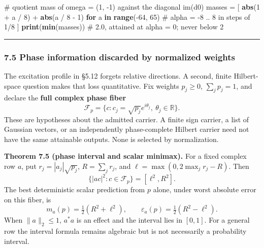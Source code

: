 \documentclass[
  11pt,
]{article}
\newenvironment{Shaded}{\begin{snugshade}}{\end{snugshade}}
\newcommand{\BuiltInTok}[1]{\textcolor[rgb]{0.39,0.29,0.61}{\textbf{#1}}}
\newcommand{\CommentTok}[1]{\textcolor[rgb]{0.54,0.53,0.53}{#1}}
\newcommand{\ControlFlowTok}[1]{\textcolor[rgb]{0.12,0.11,0.11}{\textbf{#1}}}
\newcommand{\DecValTok}[1]{\textcolor[rgb]{0.69,0.50,0.00}{#1}}
\newcommand{\KeywordTok}[1]{\textcolor[rgb]{0.12,0.11,0.11}{\textbf{#1}}}
\newcommand{\NormalTok}[1]{\textcolor[rgb]{0.12,0.11,0.11}{#1}}
\newcommand{\OperatorTok}[1]{\textcolor[rgb]{0.12,0.11,0.11}{#1}}
\begin{document}
\begin{Shaded}
\begin{Highlighting}[]
\CommentTok{\# quotient mass of omega = (1, {-}1) against the diagonal im(d0)}
\NormalTok{masses }\OperatorTok{=}\NormalTok{ [}
    \BuiltInTok{abs}\NormalTok{(}\DecValTok{1} \OperatorTok{+}\NormalTok{ a }\OperatorTok{/} \DecValTok{8}\NormalTok{) }\OperatorTok{+} \BuiltInTok{abs}\NormalTok{(a }\OperatorTok{/} \DecValTok{8} \OperatorTok{{-}} \DecValTok{1}\NormalTok{)}
    \ControlFlowTok{for}\NormalTok{ a }\KeywordTok{in} \BuiltInTok{range}\NormalTok{(}\OperatorTok{{-}}\DecValTok{64}\NormalTok{, }\DecValTok{65}\NormalTok{)  }\CommentTok{\# alpha = {-}8 .. 8 in steps of 1/8}
\NormalTok{]}
\BuiltInTok{print}\NormalTok{(}\BuiltInTok{min}\NormalTok{(masses))  }\CommentTok{\# 2.0, attained at alpha = 0; never below 2}
\end{Highlighting}
\end{Shaded}

\begin{center}\rule{0.5\linewidth}{0.5pt}\end{center}

\subsubsection{7.5 Phase information discarded by normalized weights}\label{phase-information-discarded-by-normalized-weights}

The excitation profile in §5.12 forgets relative directions. A second, finite
Hilbert-space question makes that loss quantitative. Fix weights \(p_j\ge0\),
\(\sum_jp_j=1\), and declare the \textbf{full complex phase fiber}
\[
\mathcal F_p=\{c:c_j=\sqrt{p_j}e^{i\theta_j},\ \theta_j\in\mathbb R\}.
\]
These are hypotheses about the admitted carrier. A finite sign carrier,
a list of Gaussian vectors, or an independently phase-complete Hilbert carrier
need not have the same attainable outputs. None is selected by normalization.

\textbf{Theorem 7.5 (phase interval and scalar minimax).} For a fixed complex row
\(a\), put \(r_j=|a_j|\sqrt{p_j}\), \(R=\sum_jr_j\), and
\(\ell=\max(0,2\max_jr_j-R)\). Then
\[
\{|ac|^2:c\in\mathcal F_p\}=[\ell^2,R^2].
\]
The best deterministic scalar prediction from \(p\) alone, under worst absolute
error on this fiber, is
\[
m_a(p)=\tfrac12(R^2+\ell^2),\qquad
\varepsilon_a(p)=\tfrac12(R^2-\ell^2).
\]
When \(\lVert a\rVert_2\le1\), \(a^*a\) is an effect and the interval lies in \([0,1]\).
For a general row the interval formula remains algebraic but is not necessarily
a probability interval.
\end{document}
